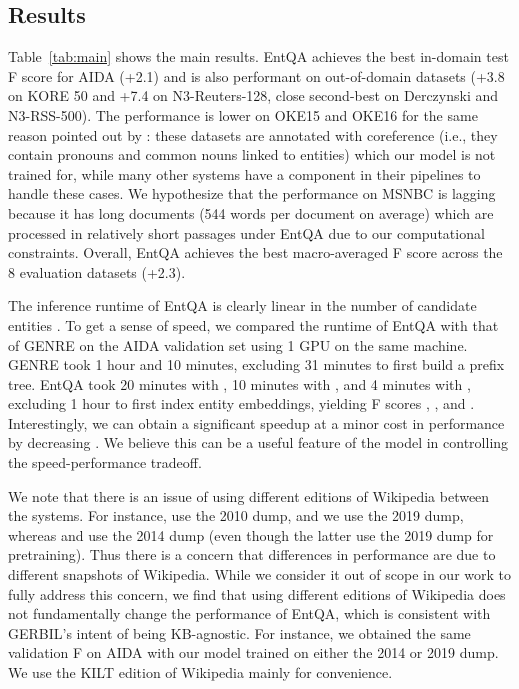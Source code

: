 \documentclass{article} \clearpage{}\usepackage{amsmath,amssymb,amsthm,bbm}
\theoremstyle{definition}
\begin{document}
\subsection{Results}
\label{subsec:results}


Table~\ref{tab:main} shows the main results.
EntQA achieves the best in-domain test F score for AIDA (+2.1) and is also performant on out-of-domain datasets
(+3.8 on KORE 50 and +7.4 on N3-Reuters-128, close second-best on Derczynski and N3-RSS-500).
The performance is lower on OKE15 and OKE16 for the same reason pointed out by \cite{cao2021autoregressive}:
these datasets are annotated with coreference (i.e., they contain pronouns and common nouns linked to entities)
which our model is not trained for, while many other systems have a component in their pipelines to handle these cases.
We hypothesize that the performance on MSNBC is lagging because it has long documents (544 words per document on average)
which are processed in relatively short passages under EntQA due to our computational constraints.
Overall, EntQA achieves the best macro-averaged F score across the 8 evaluation datasets (+2.3).

The inference runtime of EntQA is clearly linear in the number of candidate entities .
To get a sense of speed, we compared the runtime of EntQA with that of GENRE on the AIDA validation set using 1 GPU on the same machine.
GENRE took 1 hour and 10 minutes, excluding 31 minutes to first build a prefix tree.
EntQA took 20 minutes with , 10 minutes with , and 4 minutes with , excluding 1 hour to first index entity embeddings, yielding F scores , , and .
Interestingly, we can obtain a significant speedup at a minor cost in performance by decreasing .
We believe this can be a useful feature of the model in controlling the speed-performance tradeoff.


We note that there is an issue of using different editions of Wikipedia between the systems.
For instance, \cite{hoffart2011robust} use the 2010 dump, \cite{van2020rel} and we use the 2019 dump,
whereas \cite{kolitsas2018end} and \cite{cao2021autoregressive} use the 2014 dump (even though the latter use the 2019 dump for pretraining).
Thus there is a concern that differences in performance are due to different snapshots of Wikipedia.
While we consider it out of scope in our work to fully address this concern, we find that using different editions of Wikipedia does not fundamentally change
the performance of EntQA, which is consistent with GERBIL's intent of being KB-agnostic.
For instance, we obtained the same validation F on AIDA with our model trained on either the 2014 or 2019 dump.
We use the KILT edition of Wikipedia mainly for convenience.
\end{document}
